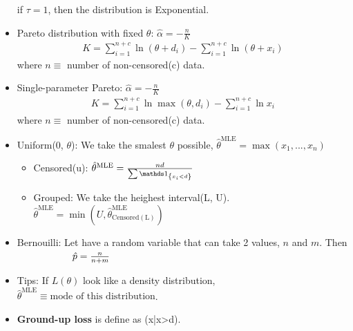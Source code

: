 \documentclass[10pt, french]{article}
\begin{document}
\begin{multicols*}{3}
\begin{itemize}[align=left,leftmargin=*]
    if $\tau=1$, then the distribution is Exponential.
    \item Pareto distribution with fixed $\theta$: $\hat{\alpha} = -\frac{n}{K}$
    \begin{align*}
      K = \sum_{i=1}^{n+c} \ln(\theta+d_i) - \sum_{i=1}^{n+c} \ln(\theta+x_i)
    \end{align*}
    where $n\equiv$ number of non-censored(c) data.
    \item Single-parameter Pareto: $\hat{\alpha} = -\frac{n}{K}$
    \begin{align*}
      K = \sum_{i=1}^{n+c} \ln \max(\theta, d_i) - \sum_{i=1}^{n+c} \ln x_i
    \end{align*}
    where $n\equiv$ number of non-censored(c) data.
    \item Uniform(0, $\theta$): We take the smalest $\theta$ possible, $\hat{\theta}^{\mathrm{MLE}} = \max(x_1,...,x_n)$
    \begin{itemize}
        \item Censored(u): $\hat{\theta}^{\mathrm{MLE}} = \frac{n d}{\sum \indic{x_i < d }}$
        \item Grouped: We take the heighest interval(L, U). $\hat{\theta}^{\mathrm{MLE}} = \min(U, \hat{\theta}^{\mathrm{MLE}}_{\mathrm{Censored(L)}}) $
    \end{itemize}
    \item Bernouilli: Let have a random variable that can take 2 values, $n$ and $m$. Then \\
    $\hspace*{2cm} \hat{p} = \frac{n}{n+m}$
    \item Tips: If $L(\theta)$ look like a density distribution, $\hat{\theta}^{\mathrm{MLE}}\equiv\text{mode of this distribution}$.
    \item \textbf{Ground-up loss} is define as (x|x>d).
\end{itemize}


\end{multicols*}
\end{document}
